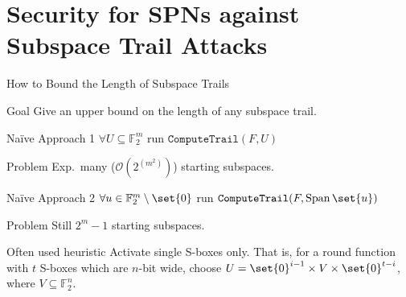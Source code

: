 \documentclass[%
    10pt,
    professionalfont,
    aspectratio=169,
    handout,
]{beamer}
\newcommand{\F}{\mathbb{F}}
\DeclareMathOperator{\SpanOp}{Span}
\newcommand{\Span}[1]{\SpanOp\set{#1}}
\begin{document}
\section{Security for SPNs against Subspace Trail Attacks}
\begin{frame}{How to Bound the Length of Subspace Trails}
    \centering
    \begin{block}{Goal}
        Give an upper bound on the length of any subspace trail.
    \end{block}
    \pause

    \begin{minipage}{0.45\textwidth}
    \begin{block}{Na\"ive Approach 1}
        $\forall U \subseteq \F_2^m$ run $\texttt{ComputeTrail}(F, U)$
    \end{block}
    \begin{alertblock}{Problem}
        Exp.\ many ($\mathcal{O}(2^{(m^2)})$) starting subspaces.
    \end{alertblock}
    \end{minipage}%
    \pause%
    \hspace{5pt}%
    \begin{minipage}{0.48\textwidth}
    \begin{block}{Na\"ive Approach 2}
        $\forall u \in \F_2^m \setminus \set{0}$ run $\texttt{ComputeTrail}(F, \Span{u})$
    \end{block}
    \begin{alertblock}{Problem}
        Still $2^m-1$ starting subspaces.
    \end{alertblock}
    \end{minipage}
    \pause

    \begin{block}{Often used heuristic}
        Activate single S-boxes only.
        That is, for a round function with $t$ S-boxes which are $n$-bit wide, choose $U = \set{0}^{i-1} \times V \times \set{0}^{t-i}$, where $V \subseteq \F_2^n$.
    \end{block}
\end{frame}
\end{document}
